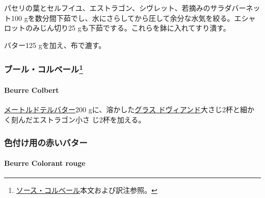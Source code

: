 \begin{recette}
パセリの葉とセルフイユ、エストラゴン、シヴレット、若摘みのサラダバーネッ
ト100 gを数分間下茹でし、水にさらしてから圧して余分な水気を絞る。エシャ
ロットのみじん切り25 gも下茹でする。これらを鉢に入れてすり潰す。

バター125 gを加え、布で漉す。

\maeaki

\hypertarget{ux30d6ux30fcux30ebux30b3ux30ebux30d9ux30fcux30eb14}{%
\subsubsection[ブール・コルベール]{\texorpdfstring{ブール・コルベール\footnote{\protect\hyperlink{sauce-colbert}{ソース・コルベール}本文および訳注参照。}}{ブール・コルベール}}\label{ux30d6ux30fcux30ebux30b3ux30ebux30d9ux30fcux30eb14}}

\hypertarget{beurre-colbert}{%
\paragraph{Beurre Colbert}\label{beurre-colbert}}


\protect\hyperlink{beurre-maitre-d-hotel}{メートルドテルバター}200
gに、溶かした\protect\hyperlink{glace-de-viande}{グラス
ドヴィアンド}大さじ2杯と細かく刻んだエストラゴン小さ じ2杯を加える。

\maeaki

\hypertarget{ux8272ux4ed8ux3051ux7528ux306eux8d64ux3044ux30d0ux30bfux30fc}{%
\subsubsection{色付け用の赤いバター}\label{ux8272ux4ed8ux3051ux7528ux306eux8d64ux3044ux30d0ux30bfux30fc}}

\hypertarget{beurre-colorant-rouge}{%
\paragraph{Beurre Colorant rouge}\label{beurre-colorant-rouge}}



\end{recette}
